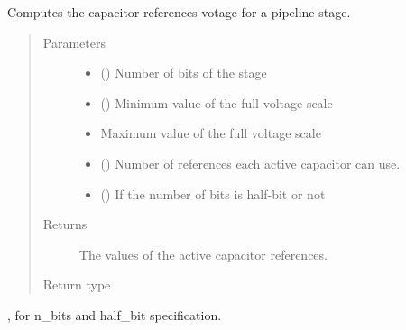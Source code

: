 \documentclass[letterpaper,10pt,english]{sphinxmanual}
\begin{document}
\begin{fulllineitems}
\label{\detokenize{gen:calib.gen.compute_ref}}
Computes the capacitor references votage for a pipeline stage.
\begin{quote}\begin{description}
\item[{Parameters}] \leavevmode\begin{itemize}
\item {} 
 (\sphinxstyleliteralemphasis{\sphinxupquote{, }}\sphinxstyleliteralemphasis{\sphinxupquote{, }}) \textendash{} Number of bits of the stage

\item {} 
 () \textendash{} Minimum value of the full voltage scale

\item {} 
 \textendash{} Maximum value of the full voltage scale

\item {} 
 () \textendash{} Number of references each active capacitor can use.

\item {} 
 () \textendash{} If the number of bits is half-bit or not

\end{itemize}

\item[{Returns}] \leavevmode
The values of the active capacitor references.

\item[{Return type}] \leavevmode
{}

\end{description}\end{quote}




{\hyperref[\detokenize{gen:calib.gen.parse_bits}]{}}, for n\_bits and half\_bit specification.



\end{fulllineitems}
\end{document}
